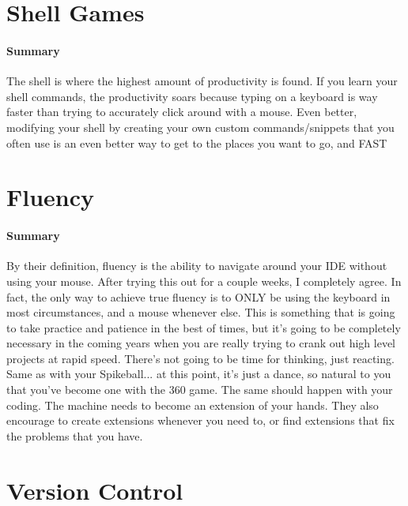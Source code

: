\documentclass{article}
\begin{document}
\section{Shell Games}
    \paragraph{Summary} The shell is where the highest amount of productivity is found. If you learn your shell commands, the productivity soars because typing on a keyboard is way faster than trying to accurately click around with a mouse. Even better, modifying your shell by creating your own custom commands/snippets that you often use is an even better way to get to the places you want to go, and FAST

\section{Fluency}
    \paragraph{Summary} By their definition, fluency is the ability to navigate around your IDE without using your mouse. After trying this out for a couple weeks, I completely agree. In fact, the only way to achieve true fluency is to ONLY be using the keyboard in most circumstances, and a mouse whenever else. This is something that is going to take practice and patience in the best of times, but it's going to be completely necessary in the coming years when you are really trying to crank out high level projects at rapid speed. There's not going to be time for thinking, just reacting. Same as with your Spikeball... at this point, it's just a dance, so natural to you that you've become one with the 360 game. The same should happen with your coding. The machine needs to become an extension of your hands. They also encourage to create extensions whenever you need to, or find extensions that fix the problems that you have.

\section{Version Control}
\end{document}
